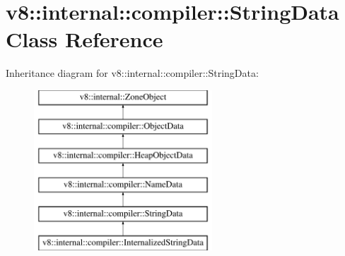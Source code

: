 \hypertarget{classv8_1_1internal_1_1compiler_1_1StringData}{}\section{v8\+:\+:internal\+:\+:compiler\+:\+:String\+Data Class Reference}
\label{classv8_1_1internal_1_1compiler_1_1StringData}
Inheritance diagram for v8\+:\+:internal\+:\+:compiler\+:\+:String\+Data\+:\begin{figure}[H]
\begin{center}
\leavevmode
\includegraphics[height=6.000000cm]{classv8_1_1internal_1_1compiler_1_1StringData}
\end{center}
\end{figure}
